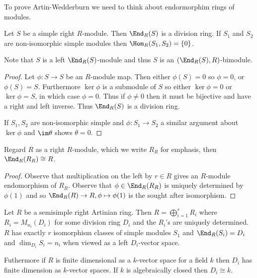 \documentclass[a4paper]{article}
\begin{document}
To prove Artin-Wedderburn we need to think about endormorphim rings of modules.

\begin{lemma}
  Let \(S\) be a simple right \(R\)-module. Then \(\End_R(S)\) is a division ring. If \(S_1\) and \(S_2\) are non-isomorphic simple modules then \(\Hom_R(S_1, S_2) = \{0\}\).
\end{lemma}

Note that \(S\) is a left \(\End_R(S)\)-module and thus \(S\) is an \((\End_R(S), R)\)-bimodule.

\begin{proof}
  Let \(\phi: S \to S\) be an \(R\)-module map. Then either \(\phi(S) = 0\) so \(\phi = 0\), or \(\phi(S) = S\). Furthermore \(\ker \phi\) is a submodule of \(S\) so either \(\ker \phi = 0\) or \(\ker \phi = S\), in which case \(\phi = 0\). Thus if \(\phi \neq 0\) then it must be bijective and have a right and left inverse. Thus \(\End_R(S)\) is a division ring.

  If \(S_1, S_2\) are non-isomorphic simple and \(\phi: S_1 \to S_2\) a similar argument about \(\ker \phi\) and \(\im \theta\) shows \(\theta = 0\).
\end{proof}

\begin{lemma}
  Regard \(R\) as a right \(R\)-module, which we write \(R_R\) for emphasis, then \(\End_R(R_R) \cong R\).
\end{lemma}

\begin{proof}
  Observe that multiplication on the left by \(r \in R\) gives an \(R\)-module endomorphism of \(R_R\). Observe that \(\phi \in \End_R(R_R)\) is uniquely determined by \(\phi(1)\) and so \(\End_R(R) \to R, \phi \mapsto \phi(1)\) is the sought after isomorphism.
\end{proof}

\begin{theorem}
  \label{thm:Artin-Wedderburn}
  Let \(R\) be a semisimple right Artinian ring. Then \(R = \bigoplus_{i = 1}^r R_i\) where \(R_i = M_{n_i}(D_i)\) for some division ring \(D_i\) and the \(R_i\)'s are uniquely determined. \(R\) has exactly \(r\) isomorphism classes of simple modules \(S_1\) and \(\End_R(S_i) = D_i\) and \(\dim_{D_i} S_i = n_i\) when viewed as a left \(D_i\)-vector space.

  Futhermore if \(R\) is finite dimensional as a \(k\)-vector space for a field \(k\) then \(D_i\) has finite dimension as \(k\)-vector spaces. If \(k\) is algebraically closed then \(D_i \cong k\).
\end{theorem}
\end{document}

